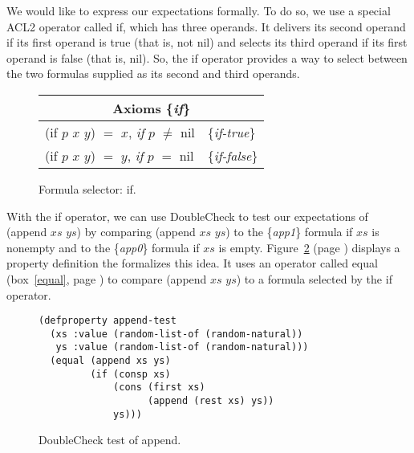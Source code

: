 We would like to express our expectations formally.
To do so, we use a special ACL2 operator
called \textsf{if}, which has three operands.
It delivers its second operand if
its first operand is true (that is, not \textsf{nil})
and selects its third operand
if its first operand is false (that is, \textsf{nil}).
So, the \textsf{if} operator provides a way to select between
the two formulas supplied as its second and third operands.

\begin{figure}
\begin{tabular}{ll}
\multicolumn{2}{c}{Axioms \{\emph{if}\}} \\
\hline
\textsf{(if $p$ $x$ $y$}) $=$ $x$, \emph{if} $p$ $\neq$ \textsf{nil}  & \{\emph{if-true}\}  \\
\textsf{(if $p$ $x$ $y$)} $=$ $y$, \emph{if} $p$ $=$ \textsf{nil}     & \{\emph{if-false}\} \\
\end{tabular}
\caption{Formula selector: \textsf{if}.}
\label{fig:if-axioms}
\end{figure}

With the \textsf{if} operator, we can use DoubleCheck
to test our expectations of \textsf{(append $xs$ $ys$)}
by comparing \textsf{(append $xs$ $ys$)} to the \{\emph{app1}\} formula
if $xs$ is nonempty and to the \{\emph{app0}\} formula if $xs$ is empty.
Figure~\ref{fig:append-test} (page \pageref{fig:append-test})
displays a property definition the formalizes this idea.
It uses an operator called
\textsf{equal} (box~\ref{equal}, page \pageref{equal})
to compare \textsf{(append $xs$ $ys$)}
to a formula selected by the \textsf{if} operator.

\begin{figure}
\begin{code}
\begin{verbatim}
(defproperty append-test
  (xs :value (random-list-of (random-natural))
   ys :value (random-list-of (random-natural)))
  (equal (append xs ys)
         (if (consp xs)
             (cons (first xs)
                   (append (rest xs) ys))
             ys)))
\end{verbatim}
\end{code}
\caption{DoubleCheck test of \textsf{append}.}
\label{fig:append-test}
\end{figure}

